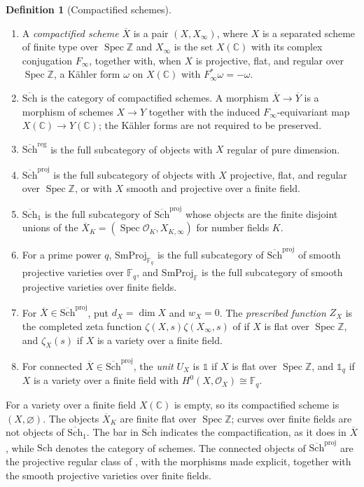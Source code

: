 \documentclass[11pt]{amsart}
\theoremstyle{plain}
\theoremstyle{definition}
\newtheorem{definition}[theorem]{Definition}
\theoremstyle{remark}
\numberwithin{equation}{section}
\newcommand{\C}{\mathbb{C}}
\newcommand{\Z}{\mathbb{Z}}
\newcommand{\F}{\mathbb{F}}
\newcommand{\Xbar}{\overline{X}}
\newcommand{\cO}{\mathcal{O}}
\newcommand{\Sch}{\mathrm{Sch}}
\newcommand{\Schbar}{\overline{\mathrm{Sch}}}
\newcommand{\SmProj}{\mathrm{SmProj}}
\DeclareMathOperator{\Spec}{Spec}
\begin{document}
\begin{definition}[Compactified schemes]
\label{def:compactified-schemes}\label{def:projective-inputs}
\begin{enumerate}[label=(\alph*)]
\item A \emph{compactified scheme} $\Xbar$ is a pair
  $(X,X_\infty)$, where $X$ is a separated scheme of finite type over
  $\Spec\Z$ and $X_\infty$ is the set $X(\C)$ with its complex conjugation
  $F_\infty$, together with, when $X$ is projective, flat, and regular
  over $\Spec\Z$, a K\"ahler form $\omega$ on $X(\C)$ with
  $F_\infty^*\omega=-\omega$.
\item $\Schbar$ is the category of compactified schemes. A morphism
  $\Xbar\to\overline Y$ is a morphism of schemes $X\to Y$ together
  with the induced $F_\infty$-equivariant map $X(\C)\to Y(\C)$; the
  K\"ahler forms are not required to be preserved.
\item $\Schbar^{\mathrm{reg}}$ is the full subcategory of objects with
  $X$ regular of pure dimension.
\item $\Schbar^{\mathrm{proj}}$ is the full subcategory of objects with
  $X$ projective, flat, and regular over $\Spec\Z$, or with $X$ smooth
  and projective over a finite field.
\item\label{item:schbar-one} $\Schbar_1$ is the full subcategory of
  $\Schbar^{\mathrm{proj}}$
  whose objects are the finite disjoint unions of the
  $\Xbar_K=(\Spec\cO_K,X_{K,\infty})$ for number fields $K$.
\item For a prime power $q$, $\SmProj_{\F_q}$ is the full subcategory
  of $\Schbar^{\mathrm{proj}}$ of smooth projective varieties over
  $\F_q$, and $\SmProj_{\F}$ is the full subcategory of smooth
  projective varieties over finite fields.
\item For $\Xbar\in\Schbar^{\mathrm{proj}}$, put $d_X=\dim X$ and
  $w_X=0$. The \emph{prescribed function} $Z_X$ is the completed zeta
  function $\zeta(X,s)\zeta(X_\infty,s)$ of
  \cite[pp.~520--521]{FlachMorin2020DeningerWeilArakelov} if $X$ is
  flat over $\Spec\Z$, and $\zeta_X(s)$ if $X$ is a variety over a
  finite field.
\item For connected $\Xbar\in\Schbar^{\mathrm{proj}}$, the \emph{unit}
  $U_X$ is $\mathbb 1$ if $X$ is flat over $\Spec\Z$, and
  $\mathbb 1_{q}$ if $X$ is a variety over a finite field with
  $H^0(X,\cO_X)\cong\F_{q}$.
\end{enumerate}
\end{definition}

For a variety over a finite field $X(\C)$ is empty, so its
compactified scheme is $(X,\varnothing)$. The objects $\Xbar_K$ are
finite flat over $\Spec\Z$; curves over finite fields are not objects
of $\Schbar_1$. The bar in $\Schbar$ indicates the compactification,
as it does in $\Xbar$, while $\Sch$ denotes the category of schemes.
The connected objects of $\Schbar^{\mathrm{proj}}$ are the projective
regular class of
\cite[Notation~2.2, pp.~521--522]{FlachMorin2020DeningerWeilArakelov},
with the morphisms made explicit, together with the smooth projective
varieties over finite fields.
\end{document}
